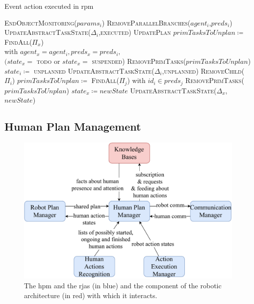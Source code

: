 \documentclass[a4paper,11pt,twoside]{StyleThese}
\begin{document}
\begin{algorithm}[!htb]
	\caption{Event action executed in \acrshort{rpm}}
	\label{chap6:algo:executed}
	\begin{algorithmic}
		\State \textsc{EndObjectMonitoring($params_i$)}
		\State \textsc{RemoveParallelBranches($agent_i$,$preds_i$)}
		\State \textsc{UpdateAbstractTaskState($\Delta_i$,\textsc{executed})}
		\State \textsc{UpdatePlan} 
	\EndFunction
	\Statex
		\State $primTasksToUnplan \coloneqq$ \textsc{FindAll}($\Pi_x$) \\\hfill with $agent_x=agent_i, preds_x=preds_i,$ \\\hfill$(state_x=$ \textsc{todo} or $state_x=$ \textsc{suspended})
		\State \textsc{RemovePrimTasks}($primTasksToUnplan$)
	\EndFunction
	\Statex
			\State $state_i\coloneqq$ \textsc{unplanned} 
			\State \textsc{UpdateAbstractTaskState($\Delta_i$,\textsc{unplanned})}
			\State \textsc{RemoveChild($\Pi_i$)}
		\EndFor
	\EndFunction
	\Statex
		\State $primTasksToUnplan \coloneqq$ \textsc{FindAll}($\Pi_j$) with $id_i \in preds_j$ 
		\State \textsc{RemovePrimTasks}($primTasksToUnplan$)
	\EndFunction
	\Statex
			\State $state_x \coloneqq newState$
			\State \textsc{UpdateAbstractTaskState($\Delta_x$,$newState$)}
		\EndIf
	\EndFunction	
	\end{algorithmic}
\end{algorithm}		

\clearpage
\subsection{Human Plan Management}\label{chap6:subsec:human_plan}

\begin{figure}[!hbt]
	\centering
	\includegraphics[width=0.85\linewidth]{figures/chapter2/human_manager_zoom.pdf}
	\caption{The \acrlong{hpm} and the \acrshort{rja}s (in blue) and the component of the robotic architecture (in red) with which it interacts.}
	\label{chap6:fig:human_manager_zoom}
\end{figure}
\end{document}
